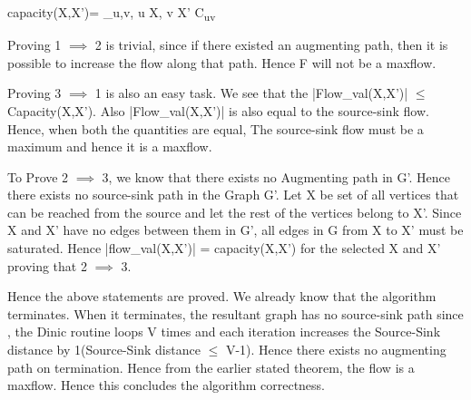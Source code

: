 \documentclass[paper=a4, fontsize=11pt]{scrartcl} %
\numberwithin{equation}{section} %
\numberwithin{figure}{section} %
\numberwithin{table}{section} %
\begin{document}
\vspace{5mm} 

capacity(X,X')= \sum\limits_{\forall u,v, u \in X, v \in X'} C\textsubscript{uv} 


\vspace{5mm} 
Proving 1 \(\implies\) 2 is trivial, since if there existed an augmenting path, then it is possible to increase the flow along that path. Hence F will not be a maxflow.  

Proving 3 \(\implies\) 1 is also an easy task. We see that the |Flow\_val(X,X')| \(\leq\) Capacity(X,X'). Also |Flow\_val(X,X')| is also equal to the source-sink flow. Hence, when both the quantities are equal, The source-sink flow must be a maximum and hence it is a maxflow.

\vspace{3mm} 
To Prove 2 \(\implies\) 3, we know that there exists no Augmenting path in G'. Hence there exists no source-sink path in the Graph G'. Let X be set of all vertices that can be reached from the source and let the rest of the vertices belong to X'. Since X and X' have no edges between them in G', all edges in G from X to X' must be saturated. Hence |flow\_val(X,X')| = capacity(X,X') for the selected X and X' proving that 2 \(\implies\) 3.

\vspace{3mm} 
Hence the above statements are proved. We already know that the algorithm terminates. When it terminates, the resultant graph has no source-sink path since , the Dinic routine loops V times and each iteration increases the Source-Sink distance by 1(Source-Sink distance \(\leq\) V-1). Hence there exists no augmenting path on termination. Hence from the earlier stated theorem, the flow is a maxflow. Hence this concludes the algorithm correctness.






\end{document}
